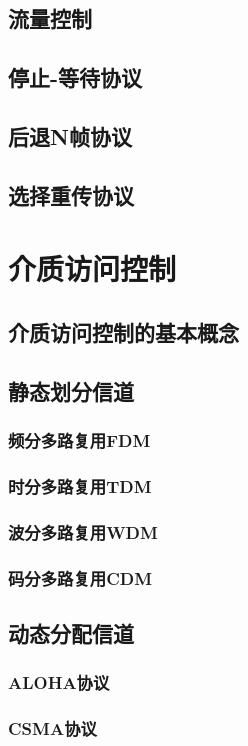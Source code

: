 \documentclass[lang=cn,newtx,10pt,scheme=chinese]{../../elegantbook}
\begin{document}
\subsection{流量控制}
\subsection{停止-等待协议}
\subsection{后退N帧协议}
\subsection{选择重传协议}

\section{介质访问控制}
\subsection{介质访问控制的基本概念}
\subsection{静态划分信道}
\subsubsection{频分多路复用FDM}
\subsubsection{时分多路复用TDM}
\subsubsection{波分多路复用WDM}
\subsubsection{码分多路复用CDM}
\subsection{动态分配信道}
\subsubsection{ALOHA协议}
\subsubsection{CSMA协议}
\end{document}

